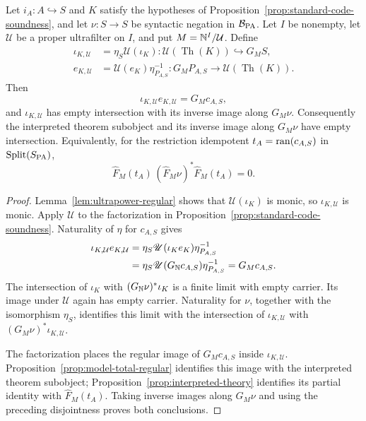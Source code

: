 \begin{theorem}
\label{thm:ultrapower-soundness}
Let $i_A:A\hookrightarrow S$ and $K$ satisfy the hypotheses of
Proposition~\ref{prop:standard-code-soundness}, and let
$\nu:S\to S$ be syntactic negation in $\mathcal B_{\mathrm{PA}}$.
Let $I$ be nonempty,
let $\mathcal U$ be a proper ultrafilter on $I$, and put
$M=\mathbb N^I/\mathcal U$. Define
\[
 \begin{aligned}
 \iota_{K,\mathcal U}
   &=\eta_S\mathscr U(\iota_K):\mathscr U(\operatorname{Th}(K))\hookrightarrow G_MS,\\
 e_{K,\mathcal U}
   &=\mathscr U(e_K)\eta_{P_{A,S}}^{-1}:
       G_MP_{A,S}\longrightarrow \mathscr U(\operatorname{Th}(K)).
 \end{aligned}
\]
Then
\begin{equation}\label{eq:ultrapower-soundness-factorization}
 \iota_{K,\mathcal U}e_{K,\mathcal U}=G_Mc_{A,S},
\end{equation}
and $\iota_{K,\mathcal U}$ has empty intersection with its inverse
image along $G_M\nu$. Consequently the interpreted theorem
subobject and its inverse image along $G_M\nu$ have empty
intersection. Equivalently, for the restriction idempotent
$t_A=\operatorname{ran}(c_{A,S})$ in $\operatorname{Split}(S_{\mathrm{PA}})$,
\[
 \widehat F_M(t_A)\,
       (\widehat F_M\nu)^*\widehat F_M(t_A)=0.
\]
\end{theorem}
\begin{proof}
Lemma~\ref{lem:ultrapower-regular} shows that
$\mathscr U(\iota_K)$ is monic, so $\iota_{K,\mathcal U}$ is monic.
Apply $\mathscr U$ to the factorization in
Proposition~\ref{prop:standard-code-soundness}. Naturality of
$\eta$ for $c_{A,S}$ gives
\[
 \begin{aligned}
 \iota_{K,\mathcal U}e_{K,\mathcal U}
 &=\eta_S\mathscr U(\iota_K e_K)\eta_{P_{A,S}}^{-1}\\
 &=\eta_S\mathscr U(G_{\mathbb N}c_{A,S})
                          \eta_{P_{A,S}}^{-1}
   =G_Mc_{A,S}.
 \end{aligned}
\]
The intersection of $\iota_K$ with $(G_{\mathbb N}\nu)^*\iota_K$ is a
finite limit with empty carrier. Its image under $\mathscr U$
again has empty carrier. Naturality for $\nu$, together with
the isomorphism $\eta_S$, identifies this limit with the
intersection of $\iota_{K,\mathcal U}$ with $(G_M\nu)^*\iota_{K,\mathcal U}$.

The factorization places the regular image of $G_Mc_{A,S}$
inside $\iota_{K,\mathcal U}$. Proposition~\ref{prop:model-total-regular}
identifies this image with the interpreted theorem subobject;
Proposition~\ref{prop:interpreted-theory} identifies its partial
identity with $\widehat F_M(t_A)$. Taking inverse images along
$G_M\nu$ and using the preceding disjointness proves both
conclusions.
\end{proof}


